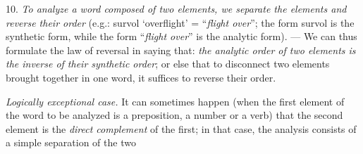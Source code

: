 {    10.   \emph{To analyze a word composed of
      two elements, we separate the elements and reverse their order}
    (e.g.: \textup{survol} `overflight' = ``\emph{flight over}''; the
    form \textup{survol} is the synthetic form, while the form
    ``\emph{flight over}'' is the analytic form). --- We can thus
    formulate the law of reversal in saying that: \emph{the analytic
      order of two elements is the inverse of their synthetic order};
    or else that to disconnect two elements brought together in one
    word, it suffices to reverse their order.

    \emph{Logically exceptional case.} It can sometimes happen (when
    the first element of the word to be analyzed is a preposition, a
    number or a verb) that the second element is the \emph{direct
      complement} of the first; in that case, the analysis consists of a
    simple separation of the two
    
  }


